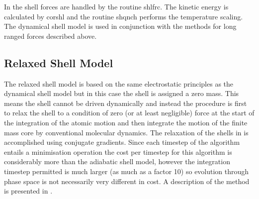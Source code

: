 In \D{} the shell forces are handled by the routine {\sc
shlfrc}. The kinetic energy is calculated by {\sc corshl} and the
routine {\sc shqnch} performs the temperature scaling. The dynamical
shell model is used in conjunction with the methods for long ranged
forces described above.

\subsection{Relaxed Shell Model}

The relaxed shell model  is
based on the same electrostatic principles as the dynamical shell
model but in this case the
shell is assigned a zero mass. This means the shell cannot be driven
dynamically and instead the procedure is first to relax the shell to a
condition of zero (or at least negligible) force at the start of the
integration of the atomic motion and then integrate the motion of the
finite mass core by conventional molecular dynamics. The relaxation of
the shells in \D{} is accomplished using conjugate
gradients. Since each timestep
of the algorithm entails a minimisation operation the cost per
timestep for this algorithm is considerably more than the adiabatic
shell model, however the integration timestep permitted is much larger
(as much as a factor 10) so evolution through phase space is not
necessarily very different in cost. A description of the method is
presented in \cite{lindan-93a}.


